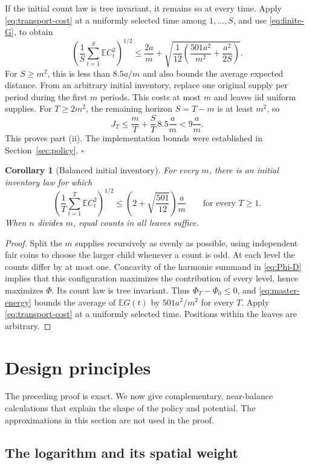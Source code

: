 \documentclass[11pt]{article}
\numberwithin{equation}{section}
\newtheorem{corollary}[theorem]{Corollary}
\theoremstyle{remark}
\newcommand{\E}{\mathbb E}
\begin{document}
If the initial count law is tree invariant, it remains so at every time.
Apply \eqref{eq:transport-cost} at a uniformly selected time among
\(1,\ldots,S\), and use \eqref{eq:finite-G}, to obtain
\[
\left(\frac1S\sum_{t=1}^S\E C_t^2\right)^{1/2}
\le \frac{2a}{m}
+\sqrt{\frac1{12}\left(\frac{501a^2}{m^2}+\frac{a^2}{2S}\right)}.
\]
For \(S\ge m^2\), this is less than \(8.5a/m\) and also bounds
the average expected distance.
From an arbitrary initial inventory, replace one original supply per
period during the first \(m\) periods. This costs at most \(m\) and
leaves iid uniform supplies. For \(T\ge2m^2\), the remaining horizon
\(S=T-m\) is at least \(m^2\), so
\[
J_T\le\frac mT+\frac ST\,8.5\frac am<9\frac am.
\]
This proves part (ii). The implementation bounds were established in
Section~\ref{sec:policy}.
\hfill\(\square\)

\begin{corollary}[Balanced initial inventory]\label{cor:balanced}
For every \(m\), there is an initial inventory law for which
\[
\left(\frac1T\sum_{t=1}^T\E C_t^2\right)^{1/2}
\le\left(2+\sqrt{\frac{501}{12}}\right)\frac am
\qquad\text{for every }T\ge1.
\]
When \(n\) divides \(m\), equal counts in all leaves suffice.
\end{corollary}
\begin{proof}
Split the \(m\) supplies recursively as evenly as possible, using
independent fair coins to choose the larger child whenever a count is odd.
At each level the counts differ by at most one. Concavity of the harmonic
summand in \eqref{eq:Phi-D} implies that this configuration maximizes
the contribution of every level, hence maximizes \(\Phi\).
Its count law is tree invariant. Thus \(\Phi_T-\Phi_0\le0\), and
\eqref{eq:master-energy} bounds the average of \(\E G(t)\) by
\(501a^2/m^2\) for every \(T\). Apply
\eqref{eq:transport-cost} at a uniformly selected time.
Positions within the leaves are arbitrary.
\end{proof}

\section{Design principles}\label{sec:heuristic}

The preceding proof is exact. We now give complementary, near-balance
calculations that explain the shape of the policy and potential.
The approximations in this section are not used in the proof.

\subsection{The logarithm and its spatial weight}
\end{document}
